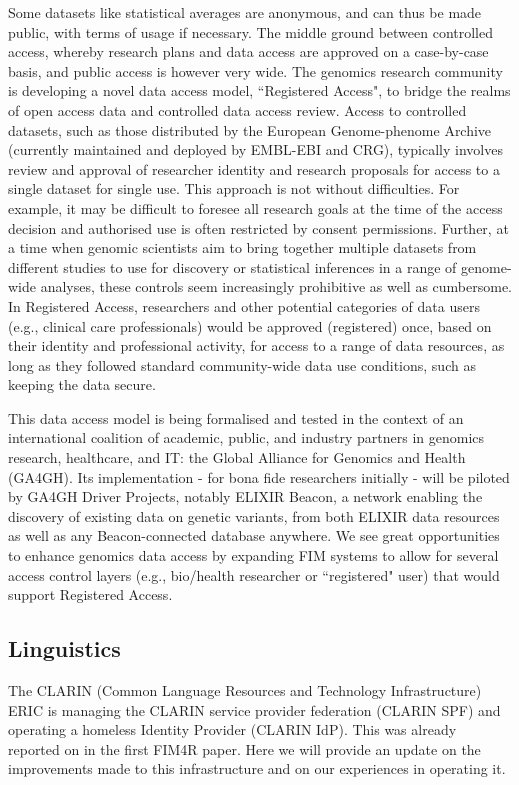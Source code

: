 \documentclass[fleqn,10pt]{wlscirep}
\begin{document}
{Some datasets like statistical averages are anonymous, and can thus be made public, with terms of usage if necessary. The middle ground between controlled access, whereby research plans and data access are approved on a case-by-case basis, and public access is however very wide. The genomics research community is developing a novel data access model, ``Registered Access", to bridge the realms of open access data and controlled data access review\cite{dyke}. Access to controlled datasets, such as those distributed by the European Genome-phenome Archive (currently maintained and deployed by EMBL-EBI and CRG), typically involves review and approval of researcher identity and research proposals for access to a single dataset for single use. This approach is not without difficulties. For example, it may be difficult to foresee all research goals at the time of the access decision and authorised use is often restricted by consent permissions. Further, at a time when genomic scientists aim to bring together multiple datasets from different studies to use for discovery or statistical inferences in a range of genome-wide analyses, these controls seem increasingly prohibitive as well as cumbersome. In Registered Access, researchers and other potential categories of data users (e.g., clinical care professionals) would be approved (registered) once, based on their identity and professional activity, for access to a range of data resources, as long as they followed standard community-wide data use conditions, such as keeping the data secure.

This data access model is being formalised and tested in the context of an international coalition of academic, public, and industry partners in genomics research, healthcare, and IT: the Global Alliance for Genomics and Health (GA4GH)\cite{ga4gh}. Its implementation - for bona fide researchers initially - will be piloted by GA4GH Driver Projects, notably ELIXIR Beacon, a network enabling the discovery of existing data on genetic variants, from both ELIXIR data resources as well as any Beacon-connected database anywhere. We see great opportunities to enhance genomics data access by expanding FIM systems to allow for several access control layers (e.g., bio/health researcher or ``registered" user) that would support Registered Access.

\subsection{Linguistics}
The CLARIN (Common Language Resources and Technology Infrastructure) ERIC is managing the CLARIN service provider federation (CLARIN SPF) and operating a homeless Identity Provider (CLARIN IdP). This was already reported on in the first FIM4R paper. Here we will provide an update on the improvements made to this infrastructure and on our experiences in operating it.

}
\end{document}
